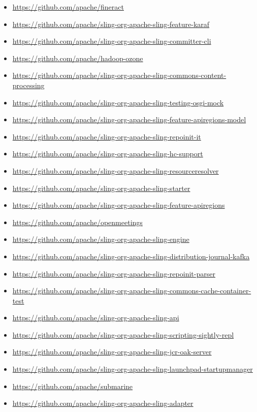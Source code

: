 \documentclass[sigconf]{acmart}
\begin{document}
\begin{itemize}
  \item \url{https://github.com/apache/fineract}
  \item \url{https://github.com/apache/sling-org-apache-sling-feature-karaf}
  \item \url{https://github.com/apache/sling-org-apache-sling-committer-cli}
  \item \url{https://github.com/apache/hadoop-ozone}
  \item \url{https://github.com/apache/sling-org-apache-sling-commons-content-processing}
  \item \url{https://github.com/apache/sling-org-apache-sling-testing-osgi-mock}
  \item \url{https://github.com/apache/sling-org-apache-sling-feature-apiregions-model}
  \item \url{https://github.com/apache/sling-org-apache-sling-repoinit-it}
  \item \url{https://github.com/apache/sling-org-apache-sling-hc-support}
  \item \url{https://github.com/apache/sling-org-apache-sling-resourceresolver}
  \item \url{https://github.com/apache/sling-org-apache-sling-starter}
  \item \url{https://github.com/apache/sling-org-apache-sling-feature-apiregions}
  \item \url{https://github.com/apache/openmeetings}
  \item \url{https://github.com/apache/sling-org-apache-sling-engine}
  \item \url{https://github.com/apache/sling-org-apache-sling-distribution-journal-kafka}
  \item \url{https://github.com/apache/sling-org-apache-sling-repoinit-parser}
  \item \url{https://github.com/apache/sling-org-apache-sling-commons-cache-container-test}
  \item \url{https://github.com/apache/sling-org-apache-sling-api}
  \item \url{https://github.com/apache/sling-org-apache-sling-scripting-sightly-repl}
  \item \url{https://github.com/apache/sling-org-apache-sling-jcr-oak-server}
  \item \url{https://github.com/apache/sling-org-apache-sling-launchpad-startupmanager}
  \item \url{https://github.com/apache/submarine}
  \item \url{https://github.com/apache/sling-org-apache-sling-adapter}

\end{itemize}
\end{document}
